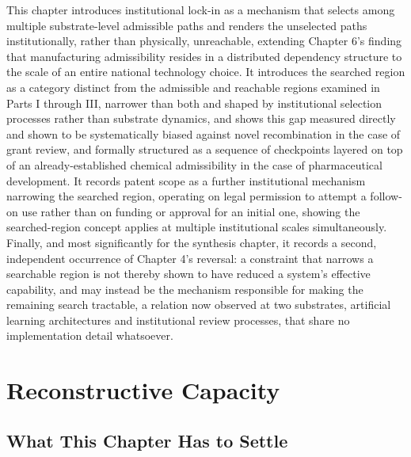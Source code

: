 \documentclass[11pt]{book}
\begin{document}
This chapter introduces institutional lock-in as a mechanism that selects among multiple substrate-level admissible paths and renders the unselected paths institutionally, rather than physically, unreachable, extending Chapter 6's finding that manufacturing admissibility resides in a distributed dependency structure to the scale of an entire national technology choice. It introduces the searched region as a category distinct from the admissible and reachable regions examined in Parts I through III, narrower than both and shaped by institutional selection processes rather than substrate dynamics, and shows this gap measured directly and shown to be systematically biased against novel recombination in the case of grant review, and formally structured as a sequence of checkpoints layered on top of an already-established chemical admissibility in the case of pharmaceutical development. It records patent scope as a further institutional mechanism narrowing the searched region, operating on legal permission to attempt a follow-on use rather than on funding or approval for an initial one, showing the searched-region concept applies at multiple institutional scales simultaneously. Finally, and most significantly for the synthesis chapter, it records a second, independent occurrence of Chapter 4's reversal: a constraint that narrows a searchable region is not thereby shown to have reduced a system's effective capability, and may instead be the mechanism responsible for making the remaining search tractable, a relation now observed at two substrates, artificial learning architectures and institutional review processes, that share no implementation detail whatsoever.


\chapter{Reconstructive Capacity}

\section{What This Chapter Has to Settle}
\end{document}
